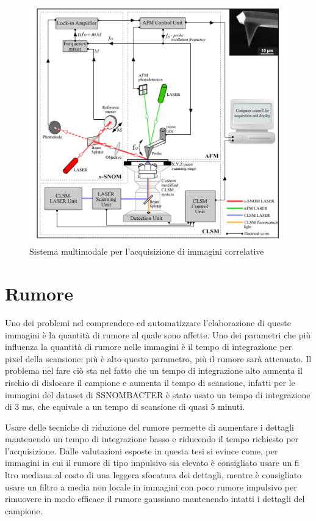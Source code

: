 \documentclass[../main.tex]{subfiles}
\begin{document}
\begin{figure}[h]
	\centering
	\includegraphics[keepaspectratio, height=\linewidth]{images/multimodal_system.jpg}
	\caption[Sistema multimodale per l'acquisizione di immagini correlative]{
		Sistema multimodale per l'acquisizione di immagini correlative \cite{stanciu_2017}}
	\label{fig:multimodal_system}
\end{figure}

\section{Rumore}

Uno dei problemi nel comprendere ed automatizzare l'elaborazione di queste immagini è la quantità di rumore al quale sono affette. Uno dei parametri che più influenza la quantità di rumore nelle immagini è il tempo di integrazione per pixel della scansione: più è alto questo parametro, più il rumore sarà attenuato. Il problema nel fare ciò sta nel fatto che un tempo di integrazione alto aumenta il rischio di dislocare il campione e aumenta il tempo di scansione, infatti per le immagini del dataset di SSNOMBACTER è stato usato un tempo di integrazione di $3$ ms, che equivale a un tempo di scansione di quasi $5$ minuti.

Usare delle tecniche di riduzione del rumore permette di aumentare i dettagli mantenendo un tempo di integrazione basso e riducendo il tempo richiesto per l'acquisizione. Dalle valutazioni esposte in questa tesi si evince come, per immagini in cui il rumore di tipo impulsivo sia elevato è consigliato usare un fi
ltro mediana al costo di una leggera sfocatura dei dettagli, mentre è consigliato usare un filtro a media non locale in immagini con poco rumore impulsivo per rimuovere in modo efficace il rumore gaussiano mantenendo intatti i dettagli del campione.
\end{document}
